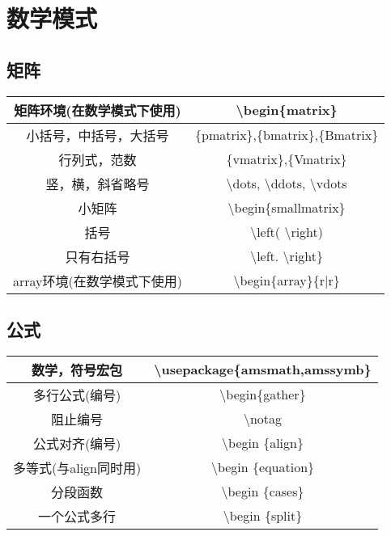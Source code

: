 \documentclass{ctexart}
\newcommand{\ttt}{\textbackslash}
\newenvironment{centertabular}[1]
    {
    \begin{center}
    \begin{tabular}{#1}
    }
    {
    \end{tabular} 
    \end{center}
    }
\begin{document}
\section{数学模式}
\subsection{矩阵}
\begin{centertabular}{|c|c|}
    \hline   
    矩阵环境(在数学模式下使用) & \ttt begin\{matrix\} \\ \hline
    小括号，中括号，大括号 & \{pmatrix\},\{bmatrix\},\{Bmatrix\} \\ \hline
    行列式，范数 & \{vmatrix\},\{Vmatrix\} \\ \hline
    竖，横，斜省略号 & \ttt dots, \ttt ddots, \ttt vdots \\ \hline
    小矩阵 & \ttt begin\{smallmatrix\} \\ \hline
    括号 & \ttt left( \ttt right) \\ \hline
    只有右括号 & \ttt left. \ttt right\} \\ \hline
    array环境(在数学模式下使用) & \ttt begin\{array\}\{r|r\} \\ \hline
\end{centertabular}

\subsection{公式}
\begin{centertabular}{|c|c|}
    \hline
    数学，符号宏包 & \ttt usepackage\{amsmath,amssymb\} \\ \hline
    多行公式(编号) & \ttt begin\{gather\} \\ \hline
    阻止编号 & \ttt notag \\ \hline
    公式对齐(编号) & \ttt begin \{align\} \\ \hline
    多等式(与align同时用) & \ttt begin \{equation\} \\ \hline
    分段函数 & \ttt begin \{cases\} \\ \hline
    一个公式多行 &  \ttt begin \{split\} \\ \hline
\end{centertabular}
\end{document}
